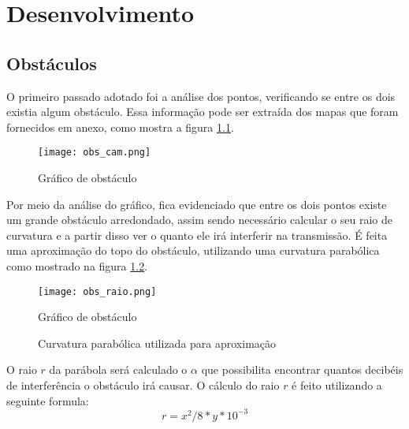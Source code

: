\chapter{Desenvolvimento}\label{cap:CnptDsng}

\section{Obstáculos}\label{sec:arqgrl}
O primeiro passado adotado foi a análise dos pontos, verificando se entre os dois existia algum obstáculo. Essa informação pode ser extraída dos mapas que foram fornecidos em anexo, como mostra a figura \ref{fig:obs_cam}.
\begin{figure}[h]
	\centering
	\texttt{[image: obs\_cam.png]}
	\caption{Gráfico de obstáculo}
	\label{fig:obs_cam}
\end{figure} 

Por meio da análise do gráfico, fica evidenciado que entre os dois pontos existe um grande obstáculo arredondado, assim sendo necessário calcular o seu raio de curvatura e a partir disso ver o quanto ele irá interferir na transmissão.
É feita uma aproximação do topo do obstáculo, utilizando uma curvatura parabólica como mostrado na figura \ref{fig:obs_raio}.

\begin{figure}[h]
	\centering
	\texttt{[image: obs\_raio.png]}
	\caption{Gráfico de obstáculo}
	\label{fig:obs_raio}
	\caption{Curvatura parabólica utilizada para aproximação}
\end{figure} 

O raio $r$ da parábola será calculado o $\alpha$ que possibilita encontrar quantos decibéis de interferência o obstáculo irá causar. O cálculo do raio $r$ é feito utilizando a seguinte formula:
\begin{equation}
r = {x^2/8*y}*10^{-3}
\end{equation}












